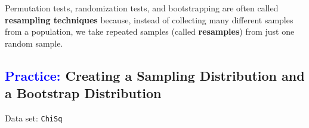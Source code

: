 \documentclass[
]{report}
\begin{document}
Permutation tests, randomization tests, and bootstrapping are often called \textbf{resampling techniques} because, instead of collecting many different samples from a population, we take repeated samples (called \textbf{resamples}) from just one random sample.

\hypertarget{creating-a-sampling-distribution-and-a-bootstrap-distribution}{%
\subsection*{\texorpdfstring{\textcolor{blue}{Practice:} Creating a Sampling Distribution and a Bootstrap Distribution}{ Creating a Sampling Distribution and a Bootstrap Distribution}}\label{creating-a-sampling-distribution-and-a-bootstrap-distribution}}

\vspace{-1em}

Data set: \texttt{ChiSq}
\end{document}
